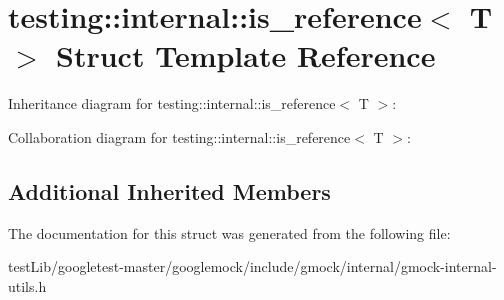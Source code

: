 \hypertarget{structtesting_1_1internal_1_1is__reference}{}\section{testing\+:\+:internal\+:\+:is\+\_\+reference$<$ T $>$ Struct Template Reference}
\label{structtesting_1_1internal_1_1is__reference}


Inheritance diagram for testing\+:\+:internal\+:\+:is\+\_\+reference$<$ T $>$\+:


Collaboration diagram for testing\+:\+:internal\+:\+:is\+\_\+reference$<$ T $>$\+:
\subsection*{Additional Inherited Members}


The documentation for this struct was generated from the following file\+:\begin{DoxyCompactItemize}
\item 
test\+Lib/googletest-\/master/googlemock/include/gmock/internal/gmock-\/internal-\/utils.\+h\end{DoxyCompactItemize}
